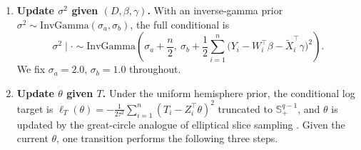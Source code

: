 \documentclass[11pt]{article}
\theoremstyle{definition}
\theoremstyle{plain}
\begin{document}
\begin{enumerate}[leftmargin=*,nosep]
Under a Gaussian prior $\gamma\sim\mathcal N(m_\gamma,V_\gamma)$, the full conditional is $\gamma\mid\cdot \sim \mathcal N(m_{\gamma\mid\cdot},V_{\gamma\mid\cdot})$ with
\begin{align*}
    V_{\gamma\mid\cdot} =\Big(V_\gamma^{-1}+\sigma^{-2}\sum_{i=1}^n \widetilde X_i\widetilde X_i^\top\Big)^{-1},\qquad
    m_{\gamma\mid\cdot} = V_{\gamma\mid\cdot}\Big(V_\gamma^{-1}m_\gamma+\sigma^{-2}\sum_{i=1}^n \widetilde X_i \big(Y_i-W_i^\top\beta\big)\Big).
\end{align*}
In all experiments we use $m_\beta=0$, $V_\beta=100\,I_p$ and $m_\gamma=0$, $V_\gamma=100\,I_r$.
\item \textbf{Update $\sigma^2$ given $(D,\beta,\gamma)$.}
With an inverse-gamma prior $\sigma^2\sim\mathrm{InvGamma}(\sigma_a,\sigma_b)$, the full conditional is
\begin{equation*}
\sigma^2\mid\cdot \sim \mathrm{InvGamma}\!\left(\sigma_a+\frac n2,\ \sigma_b+\frac12\sum_{i=1}^n\big(Y_i-W_i^\top\beta-\widetilde X_i^\top\gamma\big)^2\right).
\end{equation*}
We fix $\sigma_a=2.0$, $\sigma_b=1.0$ throughout.
\item \textbf{Update $\theta$ given $T$.}
Under the uniform hemisphere prior, the conditional log target is $\ell_T(\theta)=-\tfrac{1}{2\tau^2}\sum_{i=1}^n(T_i-Z_i^\top\theta)^2$ truncated to $\mathbb S^{q-1}_+$, and $\theta$ is updated by the great-circle analogue of elliptical slice sampling \citep{Murray2010,Neal2003}. Given the current $\theta$, one transition performs the following three steps.


\end{enumerate}
\end{document}
